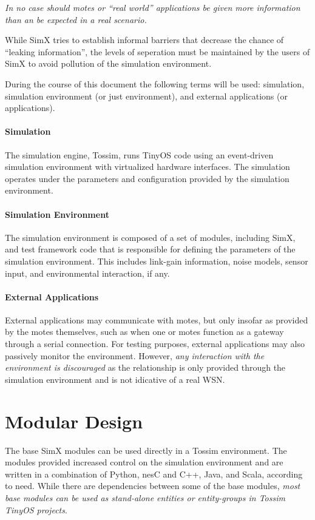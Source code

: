 {\em In no case should motes or ``real world'' applications be given
  more information than an be expected in a real scenario.}

While SimX tries to establish informal barriers that decrease the
chance of ``leaking information'', the levels of seperation must be
maintained by the users of SimX to avoid pollution of the simulation
environment.

During the course of this document the following terms will be used:
simulation, simulation environment (or just environment), and external
applications (or applications).

\paragraph{Simulation}
The simulation engine, Tossim, runs TinyOS code using an event-driven
simulation environment with virtualized hardware interfaces. The
simulation operates under the parameters and configuration provided by
the simulation environment.

\paragraph{Simulation Environment}
The simulation environment is composed of a set of modules, including
SimX, and test framework code that is responsible for defining the
parameters of the simulation environment. This includes link-gain
information, noise models, sensor input, and environmental
interaction, if any.

\paragraph{External Applications}
External applications may communicate with motes, but only insofar as
provided by the motes themselves, such as when one or motes function
as a gateway through a serial connection. For testing purposes,
external applications may also passively monitor the
environment. However, {\em any interaction with the environment is
  discouraged} as the relationship is only provided through the
simulation environment and is not idicative of a real WSN.

\section{Modular Design}

The base SimX modules can be used directly in a Tossim
environment. The modules provided increased control on the simulation
environment and are written in a combination of Python, nesC and C++,
Java, and Scala, according to need. While there are dependencies
between some of the base modules, {\em most base modules can be used
  as stand-alone entities or entity-groups in Tossim TinyOS projects}.

